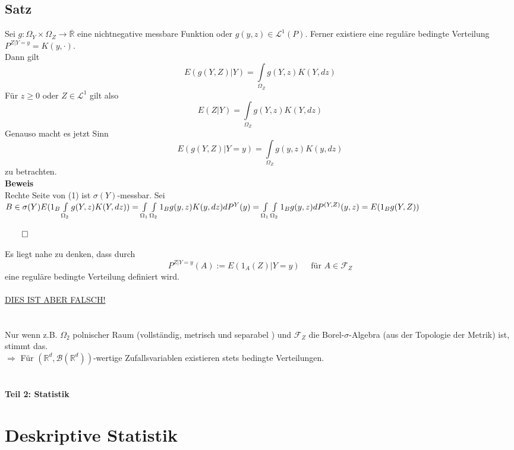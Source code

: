 \documentclass[german,10pt,oneside, fleqn, a4paper]{article}
\newcommand {\R}	{\mathbb{R}}
\newcommand{\Ra}	{\Rightarrow}
\newcommand{\ra}{\rightarrow}
\newcommand{\brc}[1]{\left(#1\right)}
\newcommand{\QED}{\begin{flushright}$\qed$\end{flushright}}
\newcommand{\mc}[1]{\mathcal{#1}}
\newcommand{\lp}[1]{\mc{L}^{#1}}
\newcommand{\beweis}{\textbf{Beweis}\\}
\newcommand{\1}[1]{1_{#1}}
\newcommand{\2}[1]{\1{\brac{#1}}}
\newcommand{\rbor}[1][d]{\brc{\R^{#1},\mc{B}\brc{\R^{#1}}}}
\newcommand{\f}{\mc{F}}
\begin{document}
\subsection{Satz}
\label{7.6}
Sei $g:\Omega_Y\times\Omega_Z\ra\overline{\R}$ eine nichtnegative messbare Funktion oder $g(y,z)\in\lp{1}(P).$ Ferner existiere eine reguläre bedingte Verteilung $P^{Z|Y=y}=K(y,\cdot).$\\
Dann gilt\begin{equation}
E(g(Y,Z)|Y)=\int\limits_{\Omega_Z}g(Y,z)K(Y,dz)
\end{equation}
Für $z\geq0$ oder $Z\in\lp{1}$ gilt also \[
E(Z|Y)=\int\limits_{\Omega_Z}g(Y,z)K(Y,dz)\]
Genauso macht es jetzt Sinn \[
E(g(Y,Z)|Y=y)=\int\limits_{\Omega_Z}g(y,z)K(y,dz)\]
zu betrachten.\\
\beweis
Rechte Seite von (1) ist $\sigma(Y)$-messbar. Sei $B\in\sigma(Y)\\
E(1_B\int\limits_{\Omega_2}g(Y,z)K(Y,dz))=\int\limits_{\Omega_1}\int\limits_{\Omega_2}1_Bg(y,z)K(y,dz)dP^Y(y)\\
=\int\limits_{\Omega_1}\int\limits_{\Omega_2}1_Bg(y,z)dP^{(Y,Z)}(y,z)=E(1_Bg(Y,Z))$\QED

Es liegt nahe zu denken, dass durch \[
P^{Z|Y=y}(A):=E(1_A(Z)|Y=y)\quad\text{ für } A\in\f_Z\]
eine reguläre bedingte Verteilung definiert wird.\\
\\

\underline{\large{DIES IST ABER FALSCH!}}\\
\\
\\
Nur wenn z.B. $\Omega_2$ polnischer Raum (vollständig, metrisch und separabel%
) und $\f_Z$ die Borel-$\sigma$-Algebra (aus der Topologie der Metrik) ist, stimmt das.\\
$\Ra$ Für $\rbor$-wertige Zufallsvariablen existieren stets bedingte Verteilungen.
\\
\\
\\





\pagebreak
\textbf{\huge{Teil 2: Statistik}}
\section{Deskriptive Statistik}
\end{document}
